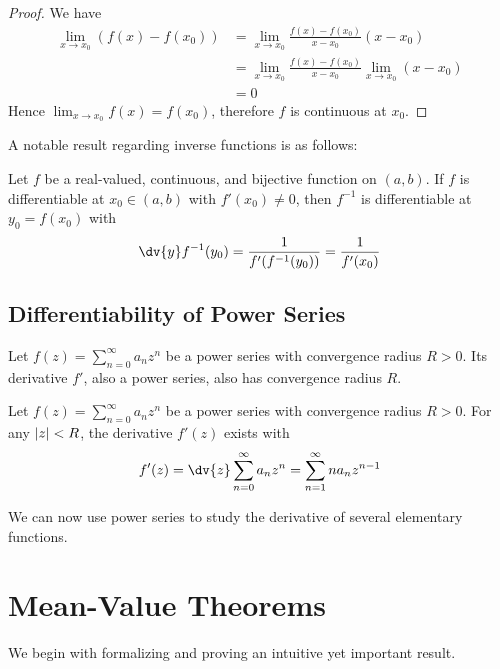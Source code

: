 \documentclass{styles/tufte}
\begin{document}
\begin{proof}
  We have
  \begin{align*}
    \lim_{x \to x_0} \left(f(x) - f(x_0)\right) &= \lim_{x \to x_0} \frac{f(x) - f(x_0)}{x - x_0} (x - x_0) \\
    &= \lim_{x \to x_0} \frac{f(x) - f(x_0)}{x - x_0} \lim_{x \to x_0} (x - x_0) \\
    &= 0
  \end{align*}
  Hence $\lim_{x \to x_0} f(x) = f(x_0)$, therefore $f$ is continuous at $x_0$.
\end{proof}

A notable result regarding inverse functions is as follows:
\begin{theorem}{}{}
  Let $f$ be a real-valued, continuous, and bijective function on $(a, b)$. If $f$ is differentiable at $x_0 \in (a, b)$ with $f'(x_0) \neq 0$, then $f^{-1}$ is differentiable at $y_0 = f(x_0)$ with
  \[ \dv{y} f^{-1}(y_0) = \frac{1}{f'(f^{-1}(y_0))} = \frac{1}{f'(x_0)} \]
\end{theorem}


\subsection{Differentiability of Power Series}
  
  \begin{theorem}{}{}
    Let $f(z) = \sum_{n=0}^\infty a_n z^n$ be a power series with convergence radius $R > 0$. Its derivative $f'$, also a power series, also has convergence radius $R$.
  \end{theorem}
  
  \begin{theorem}{}{}
    Let $f(z) = \sum_{n=0}^\infty a_n z^n$ be a power series with convergence radius $R > 0$. For any $\abs{z} < R$, the derivative $f'(z)$ exists with
    \[ f'(z) = \dv{z} \sum_{n=0}^\infty a_n z^n = \sum_{n=1}^\infty n a_n z^{n-1} \]
  \end{theorem}
  
  We can now use power series to study the derivative of several elementary functions.



\section{Mean-Value Theorems}

We begin with formalizing and proving an intuitive yet important result.
\end{document}
